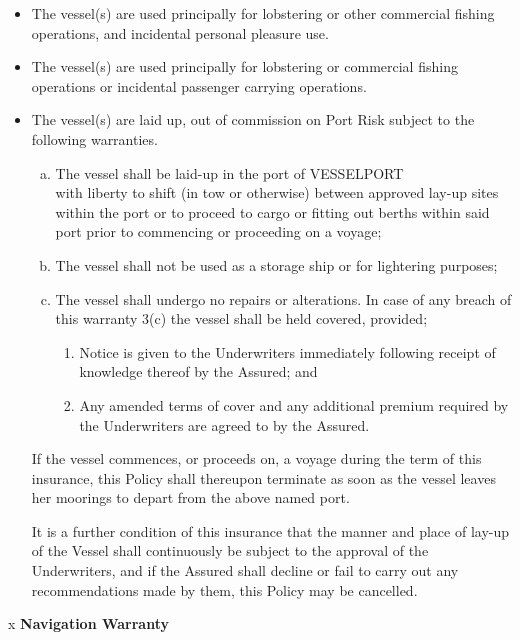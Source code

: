 \documentclass[10pt]{article}
\newcommand{\mybox}{\fboxsep=-.15pt\fbox{\rule{0pt}{2.5ex}\rule{2.5ex}{0pt}}}
\newcommand{\checkbox}[2]{%
    \ifthenelse{\equal{#1}{#2}}  
            {X}               
            {\mybox}
}
\begin{document}
\begin{itemize}
    \item[\checkbox{1}{\VesselItem} 1.] The vessel(s) are used principally for lobstering or other commercial fishing operations, and incidental personal pleasure use. 
    \item[\checkbox{2}{\VesselItem} 2.] The vessel(s) are used principally for lobstering or commercial fishing operations or incidental passenger carrying operations.
    \item[\checkbox{3}{\VesselItem} 3.] The vessel(s) are laid up, out of commission on Port Risk subject to the following warranties.
    \begin{enumerate}[(a)]
        \item The vessel shall be laid-up in the port of VESSELPORT \\ with liberty to shift (in tow or otherwise) between approved lay-up sites within the port or to proceed to cargo or fitting out berths within said port prior to commencing or proceeding on a voyage;    
        \item The vessel shall not be used as a storage ship or for lightering purposes;
        \item The vessel shall undergo no repairs or alterations.  In case of any breach of this warranty 3(c) the vessel shall be held covered, provided;
        \begin{enumerate}[(1)]
            \item Notice is given to the Underwriters immediately following receipt of knowledge thereof by the Assured; and
            \item Any amended terms of cover and any additional premium required by the Underwriters are agreed to by the Assured.
        \end{enumerate}
    \end{enumerate}
    If the vessel commences, or proceeds on, a voyage during the term of this insurance, this Policy shall thereupon terminate as soon as the vessel leaves her moorings to depart from the above named port.

    It is a further condition of this insurance that the manner and place of lay-up of the Vessel shall continuously be subject to the approval of the Underwriters, and if the Assured shall decline or fail to carry out any recommendations made by them, this Policy may be cancelled. 
\end{itemize}

\vspace{\baselineskip}
x \hspace{0.25in} \textbf{Navigation Warranty}
\end{document}
